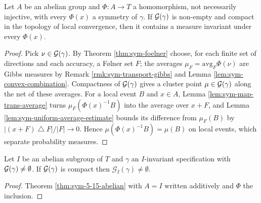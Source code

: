 \begin{theorem}[Georgii (5.15)(ii) with $I_0 = \set{\mathrm{id}}$]
    \label{thm:sym-5-15-abelian}
    \leanok

    Let $A$ be an abelian group and $\Phi : A \to T$ a homomorphism, not necessarily injective,
    with every $\Phi(x)$ a symmetry of $\gamma$. If $\mathcal{G}(\gamma)$ is non-empty and compact in
    the topology of local convergence, then it contains a measure invariant under every
    $\Phi(x)$.
\end{theorem}
\begin{proof}
    \leanok

    Pick $\nu \in \mathcal{G}(\gamma)$. By Theorem \ref{thm:sym-foelner} choose, for each finite set
    of directions and each accuracy, a F\o lner set $F$; the averages
    $\mu_F = \mathrm{avg}_F \Phi(\nu)$ are Gibbs measures by
    Remark \ref{rmk:sym-transport-gibbs} and Lemma \ref{lem:sym-convex-combination}. Compactness
    of $\mathcal{G}(\gamma)$ gives a cluster point $\mu \in \mathcal{G}(\gamma)$ along the net of these
    averages. For a local event $B$ and $x \in A$, Lemma \ref{lem:sym-map-trans-average} turns
    $\mu_F(\Phi(x)^{-1}B)$ into the average over $x + F$, and
    Lemma \ref{lem:sym-uniform-average-estimate} bounds its difference from $\mu_F(B)$ by
    $|(x+F) \mathbin{\triangle} F| / |F| \to 0$. Hence $\mu(\Phi(x)^{-1}B) = \mu(B)$ on local
    events, which separate probability measures.
\end{proof}

\begin{corollary}
    \label{cor:sym-5-16-abelian}
    \leanok

    Let $I$ be an abelian subgroup of $T$ and $\gamma$ an $I$-invariant specification with
    $\mathcal{G}(\gamma) \neq \emptyset$. If $\mathcal{G}(\gamma)$ is compact then
    $\mathcal{G}_I(\gamma) \neq \emptyset$.
\end{corollary}
\begin{proof}
    \leanok

    Theorem \ref{thm:sym-5-15-abelian} with $A = I$ written additively and $\Phi$ the
    inclusion.
\end{proof}


